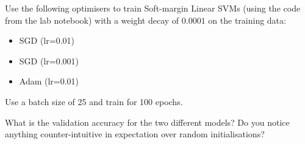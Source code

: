 \documentclass[a4paper]{article}
\begin{document}
\begin{tcolorbox}[title=2.1 Iris SVM (2 marks)]
Use the following optimisers to train Soft-margin Linear SVMs (using the code from the lab notebook) with a weight decay of $0.0001$ on the training data: 
\begin{itemize}
	\item SGD (lr=0.01)
	\item SGD (lr=0.001)
	\item Adam (lr=0.01)
\end{itemize}
Use a batch size of 25 and train for 100 epochs.

What is the validation accuracy for the two different models? Do you notice anything counter-intuitive in expectation over random initialisations?
\end{tcolorbox}
\end{document}
